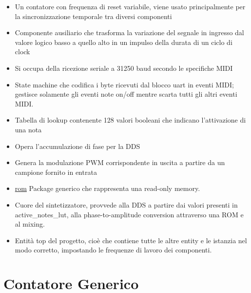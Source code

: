 \begin{itemize}
    \item \hyperref[sec:counter]{} Un contatore con frequenza di reset variabile, viene
    usato principalmente per la sincronizzazione temporale tra diversi componenti
    \item \hyperref[sec:lowhigh]{} Componente ausiliario che trasforma la variazione
    del segnale in ingresso dal valore logico basso a quello alto in un impulso della durata di un ciclo
    di clock
    \item \hyperref[sec:uart]{} Si occupa della ricezione seriale a 31250 baud secondo le specifiche MIDI
    \item \hyperref[sec:mididec]{}  State machine che codifica i byte ricevuti dal blocco uart in eventi MIDI; gestisce solamente gli eventi note on/off
    mentre scarta tutti gli altri eventi MIDI.
    \item \hyperref[sec:noteslut]{} Tabella di lookup contenente 128 valori booleani che indicano l'attivazione di una nota
    \item \hyperref[sec:phaseaccumulator]{} Opera l'accumulazione di fase per la DDS
    \item \hyperref[sec:pwmencoder]{} Genera la modulazione PWM corrispondente in uscita
    a partire da un campione fornito in entrata
    \item \hyperref[sec:rom]{rom} Package generico che rappresenta una read-only memory.
    \item \hyperref[sec:synthengine]{} Cuore del sintetizzatore, provvede alla DDS a partire dai valori presenti in active\_notes\_lut, alla phase-to-amplitude conversion attraverso una ROM e al mixing.
    \item {} Entità top del progetto, cioè che contiene tutte le altre entity e le istanzia nel modo corretto, impostando le frequenze di lavoro dei componenti.
\end{itemize}

\section{Contatore Generico}
\label{sec:counter}

